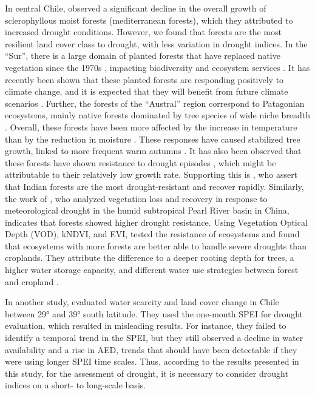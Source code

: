 \documentclass[
  authoryear,
  preprint,
  3p,
  onecolumn]{elsarticle}
\begin{document}
In central Chile, \citet{Venegas2022} observed a significant decline in
the overall growth of sclerophyllous moist forests (mediterranean
forests), which they attributed to increased drought conditions.
However, we found that forests are the most resilient land cover class
to drought, with less variation in drought indices. In the ``Sur'',
there is a large domain of planted forests that have replaced native
vegetation since the 1970s
\citep{Heilmayr2016, Heilmayr2020, Miranda2017}, impacting biodiversity
and ecosystem services \citep{Rodriguez2018}. It has recently been shown
that these planted forests are responding positively to climate change,
and it is expected that they will benefit from future climate scenarios
\citep{Carrasco2022}. Further, the forests of the ``Austral'' region
correspond to Patagonian ecosystems, mainly native forests dominated by
tree species of wide niche breadth . Overall, these forests have been
more affected by the increase in temperature than by the reduction in
moisture \citep{Fajardo2023, Holz2018}. These responses have caused
stabilized tree growth, linked to more frequent warm autumns
\citep{Gibson2022}. It has also been observed that these forests have
shown resistance to drought episodes \citep{Fajardo2023}, which might be
attributable to their relatively low growth rate. Supporting this is
\citet{Fathi-Taperasht2022}, who assert that Indian forests are the most
drought-resistant and recover rapidly. Similarly, the work of
\citet{Wu2024}, who analyzed vegetation loss and recovery in response to
meteorological drought in the humid subtropical Pearl River basin in
China, indicates that forests showed higher drought resistance. Using
Vegetation Optical Depth (VOD), kNDVI, and EVI, \citet{Xiao2023} tested
the resistance of ecosystems and found that ecosystems with more forests
are better able to handle severe droughts than croplands. They attribute
the difference to a deeper rooting depth for trees, a higher water
storage capacity, and different water use strategies between forest and
cropland \citep{Xiao2023}.

In another study, \citet{Fuentes2021} evaluated water scarcity and land
cover change in Chile between 29° and 39° south latitude. They used the
one-month SPEI for drought evaluation, which resulted in misleading
results. For instance, they failed to identify a temporal trend in the
SPEI, but they still observed a decline in water availability and a rise
in AED, trends that should have been detectable if they were using
longer SPEI time scales. Thus, according to the results presented in
this study, for the assessment of drought, it is necessary to consider
drought indices on a short- to long-scale basis.
\end{document}
